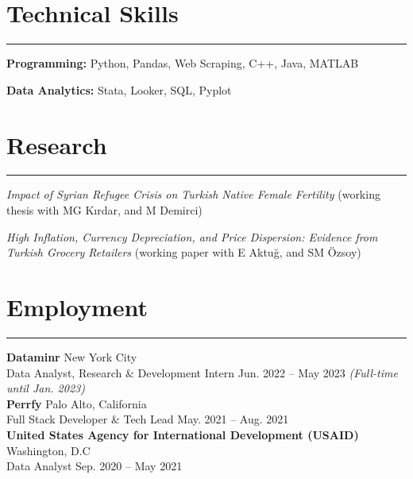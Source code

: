 \documentclass[a4paper,10pt]{article}
\newcommand{\HRule}{\rule{\linewidth}{0.5mm}}
\begin{document}
\section*{Technical Skills}
\vspace{-15pt}
\HRule

\textbf{Programming:} Python, Pandas, Web Scraping, C++, Java, MATLAB 

\textbf{Data Analytics:} Stata, Looker, SQL, Pyplot


\section*{Research}
\vspace{-15pt}
\HRule

\emph{Impact of Syrian Refugee Crisis on Turkish Native Female Fertility }
(working thesis with MG Kırdar, and M Demirci)

\emph{High Inflation, Currency Depreciation, and Price Dispersion: Evidence 
from Turkish Grocery Retailers} (working paper with E Aktuğ, and SM Özsoy)


\section*{Employment}
\vspace{-15pt}
\HRule

\textbf{Dataminr} \hfill New York City\\
Data Analyst, Research $\&$ Development Intern \hfill Jun. 2022 – May 2023 \emph{(Full-time until Jan. 2023)}\\[5pt]
\vspace{-0.5pt}
\textbf{Perrfy} \hfill Palo Alto, California\\
Full Stack Developer $\&$ Tech Lead \hfill May. 2021 – Aug. 2021 \\[5pt]
\vspace{-0.5pt}
\textbf{United States Agency for International Development (USAID)} \hfill Washington, D.C\\
Data Analyst \hfill Sep. 2020 – May 2021 





\end{document}

